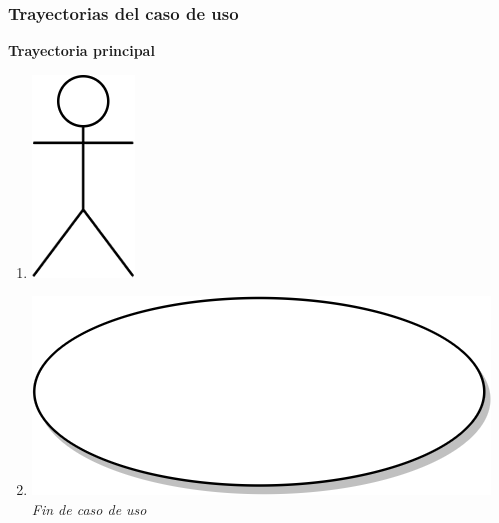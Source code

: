 \subsubsection{Trayectorias del caso de uso}
\textbf{Trayectoria principal}
\begin{enumerate}
  \item {\includegraphics[scale=.1]{Capitulo3/img/actor.png} }
  \item {\includegraphics[scale=.05]{Capitulo3/img/proceso.png}}
  \textit{Fin de caso de uso} \\  
\end{enumerate}

